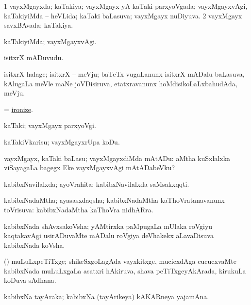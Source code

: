 \bentry
{}
\gl{\gu}
\bmng
\bnum
\num{1} vayxMgayxda; kaTakiya; vayxMgayx yA kaTaki parxyoVgada; vayxMgayxvAgi, kaTakiyiMda -- heVLida; kaTaki baLasuva; vayxMgayx nuDiyuva. 
\num{2} vayxMgayx savxBAvada; kaTakiya. 
\enum
\emng
\eentry

\bentry
{}
\gl{\kirxvi}
\bmng
kaTakiyiMda; vayxMgayxvAgi. 
\emng
\eentry

\bentry
{}
\gl{\nA}
\bmng
isitxrX mADuvudu. 
\emng
\eentry

\bentry
{}
\gl{\nA}
\bmng
isitxrX halage; isitxrX -- meVju; baTeTx \mo vugaLanunx isitxrX mADalu baLasuva, kAlugaLa meVle maNe joVDisiruva, etatxravanunx hoMdisikoLaLxbahudAda, meVju. 
\emng
\eentry

\bentry
{}
\gl{\sakirx}
\bmng
=  \hyperlink{ironize}{ironize}. 
\emng
\eentry

\bentry
{}
\gl{\nA}
\bmng
kaTaki; vayxMgayx parxyoVgi. 
\emng
\eentry

\bentry
{}
\gl{\sakirx}
\bmng
kaTakiVkarisu; vayxMgayxrUpa koDu. 
\emng

\noindent 
\gl{\akirx}
\bmng
vayxMgayx, kaTaki baLasu; vayxMgayxdiMda mAtADu:  aMtha kuSxlalxka viSayagaLa bagegx Eke vayxMgayxvAgi mAtADabeVku? 
\emng
\eentry

\bentry
{}
\gl{\gu}
\bmng
kabibxNavilalxda; ayoVrahita:  kabibxNavilalxda saMsakxqqti. 
\emng
\eentry

\bentry
{}
\gl{\gu}
\bmng
kabibxNadaMtha; ayasasxdaqsha; kabibxNadaMtha kaThoVratanavanunx toVrisuva:  kabibxNadaMtha kaThoVra nidhARra. 
\emng
\eentry

\bentry
{}
\gl{\nA}
\bmng
kabibxNada shAvxsakoVsha; yAMtirxka paMpugaLa mUlaka roVgiyu kaqtakavAgi usirADuvaMte mADalu roVgiya deVhakekx aLavaDisuva kabibxNada koVsha. 
\emng
\eentry

\bentry
{}
\gl{\nA}
\bmng
(\ca) muLuLxpeTiTxge; shikeSxgoLagAda vayxkitxge, mucicxdAga cucucxvaMte kabibxNada muLuLxgaLa asatxri hAkiruva, shava peTiTxgeyAkArada, kirukuLa koDuva sAdhana. 
\emng
\eentry

\bentry
{}
\gl{\nA}
\bmng
kabibxNa tayAraka; kabibxNa (tayArikeya) kAKARneya yajamAna. 
\emng
\eentry

